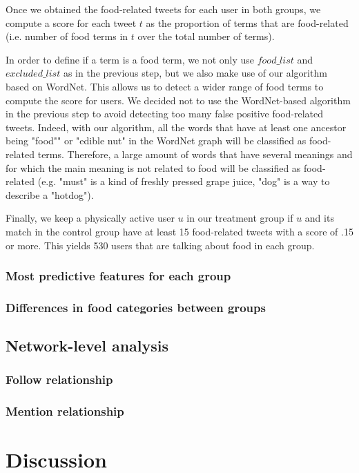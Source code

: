 \documentclass[letterpaper]{article}
\begin{document}
Once we obtained the food-related tweets for each user in both groups, we
compute a score for each tweet $t$ as the proportion of terms that are
food-related (i.e. number of food terms in $t$ over the total number of terms).

In order to define if a term is a food term, we not only use $food\_list$ and
$excluded\_list$ as in the previous step, but we also make use of our algorithm
based on WordNet. This allows us to detect a wider range of food terms to
compute the score for users. We decided not to use the WordNet-based algorithm
in the previous step to avoid detecting too many false positive food-related
tweets. Indeed, with our algorithm, all the words that have at least one
ancestor being "food"" or "edible nut" in the WordNet graph will be classified
as food-related terms. Therefore, a large amount of words that have several
meanings and for which the main meaning is not related to food will be
classified as food-related (e.g. "must" is a kind of freshly pressed grape
juice, "dog" is a way to describe a "hotdog").

Finally, we keep a physically active user $u$ in our treatment group if $u$ and
its match in the control group have at least 15 food-related tweets with a score
of .15 or more. This yields 530 users that are talking about food in each group.

\subsubsection{Most predictive features for each group}

\subsubsection{Differences in food categories between groups}


\subsection{Network-level analysis}

\subsubsection{Follow relationship}

\subsubsection{Mention relationship}

\section{Discussion}



\end{document}
